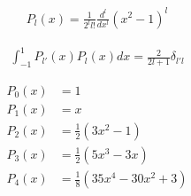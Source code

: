 %
\begin{align*}
	P_l(x) = \frac{1}{2^l l!} \frac{d^l}{dx^l} (x^2-1)^l
\end{align*}

\begin{align*}
	\int_{-1}^{1} P_{l'}(x)P_l(x) dx = \frac{2}{2l+1} \delta_{l' l}
\end{align*}

\begin{align*}
	P_0(x) &= 1 \\
	P_1(x) &= x \\
	P_2(x) &= \tfrac{1}{2}(3x^2-1) \\
	P_3(x) &= \tfrac{1}{2}(5x^3-3x) \\
	P_4(x) &= \tfrac{1}{8}(35x^4-30x^2+3) \\
\end{align*}
